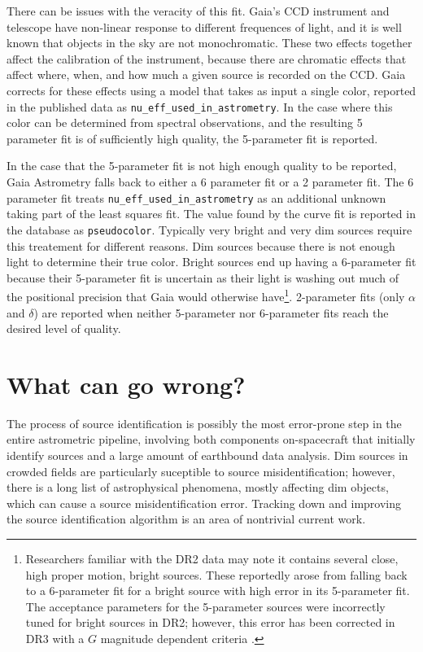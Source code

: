 \documentclass[twocolumn]{aastex631}
\begin{document}
There can be issues with the veracity of this fit. Gaia's CCD instrument and telescope have non-linear response to different frequences of light, and it is well known that objects in the sky are not monochromatic. These two effects together affect the calibration of the instrument, because there are chromatic effects that affect where, when, and how much a given source is recorded on the CCD. Gaia corrects for these effects using a model that takes as input a single color, reported in the published data as \texttt{nu\_eff\_used\_in\_astrometry}. In the case where this color can be determined from spectral observations, and the resulting 5 parameter fit is of sufficiently high quality, the 5-parameter fit is reported.

In the case that the 5-parameter fit is not high enough quality to be reported, Gaia Astrometry falls back to either a 6 parameter fit or a 2 parameter fit. The 6 parameter fit treats \texttt{nu\_eff\_used\_in\_astrometry} as an additional unknown taking part of the least squares fit. The value found by the curve fit is reported in the database as \texttt{pseudocolor}. Typically very bright and very dim sources require this treatement for different reasons. Dim sources because there is not enough light to determine their true color. Bright sources end up having a 6-parameter fit because their 5-parameter fit is uncertain as their light is washing out much of the positional precision that Gaia would otherwise have\footnote{Researchers familiar with the DR2 data may note it contains several close, high proper motion, bright sources. These reportedly arose from falling back to a 6-parameter fit for a bright source with high error in its 5-parameter fit. The acceptance parameters for the 5-parameter sources were incorrectly tuned for bright sources in DR2; however, this error has been corrected in DR3 with a $G$ magnitude dependent criteria \citep{lindegrenGaia2021a}.}. 2-parameter fits (only $\alpha$ and $\delta$) are reported when neither 5-parameter nor 6-parameter fits reach the desired level of quality.

\section{What can go wrong?} \label{sec:wrong}

The process of source identification is possibly the most error-prone step in the entire astrometric pipeline, involving both components on-spacecraft that initially identify sources and a large amount of earthbound data analysis. Dim sources in crowded fields are particularly suceptible to source misidentification; however, there is a long list of astrophysical phenomena, mostly affecting dim objects, which can cause a source misidentification error. Tracking down and improving the source identification algorithm is an area of nontrivial current work.%
\end{document}
